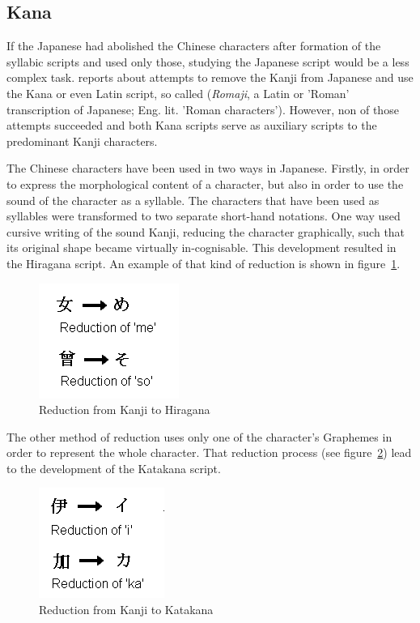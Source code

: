 \subsection{Kana }
\label{sec:kana}

If the Japanese had abolished the Chinese characters after formation of the
syllabic scripts and used only those, studying the Japanese script would be
a less complex task.  reports about attempts to remove
the Kanji from Japanese and use the Kana or even Latin script, so called
 (\emph{Romaji}, a Latin or 'Roman' transcription of Japanese; 
Eng. lit. 'Roman characters'). 
However, non of those attempts succeeded and both Kana scripts serve as 
auxiliary scripts to the predominant Kanji characters. 

The Chinese characters have been used in two ways in Japanese. 
Firstly, in order to express the morphological content of a character,
but also in order to use the sound of the character as a syllable.
The characters that have been used as syllables were transformed to two 
separate short-hand notations. 
One way used cursive writing of the sound Kanji, reducing the character 
graphically, such that its original shape became virtually in-cognisable.
This development resulted in the Hiragana script. An example of that kind of 
reduction is shown in figure~\ref{fig:reductiontohiragana}.
\begin{figure}[htbp]
\begin{center}
\includegraphics[scale=0.7]{images/reductiontohiragana.png}
\caption{Reduction from Kanji to Hiragana}
\label{fig:reductiontohiragana}
\end{center}
\end{figure}
The other method of reduction uses only one of the character's Graphemes in
order to represent the whole character. That reduction process (see 
figure~\ref{fig:reductiontokatakana}) lead to the development of the
Katakana script.
\begin{figure}[htbp] 
\begin{center}
\includegraphics[scale=0.7]{images/reductiontokatakana.png}
\caption{Reduction from Kanji to Katakana}
\label{fig:reductiontokatakana}
\end{center}
\end{figure}

